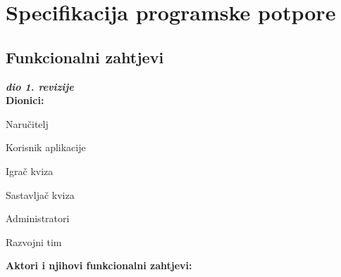 \chapter{Specifikacija programske potpore}
		
	\section{Funkcionalni zahtjevi}
			
			\textbf{\textit{dio 1. revizije}}\\
			
			\noindent \textbf{Dionici:}
			
			\begin{packed_enum}
				
				\item Naručitelj
				\item Korisnik aplikacije
				\begin{packed_enum}
					\item Igrač kviza
					\item Sastavljač kviza
				\end{packed_enum}				
				\item Administratori
				\item Razvojni tim
				
			\end{packed_enum}
			
			\noindent \textbf{Aktori i njihovi funkcionalni zahtjevi:}
			

